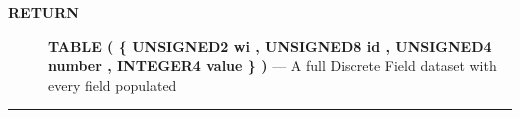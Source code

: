 \par
\begin{description}
\item [\colorbox{tagtype}{\color{white} \textbf{\textsf{RETURN}}}] \textbf{TABLE ( \{ UNSIGNED2 wi , UNSIGNED8 id , UNSIGNED4 number , INTEGER4 value \} )} --- A full Discrete Field dataset with every field populated
\end{description}




\rule{\linewidth}{0.5pt}
